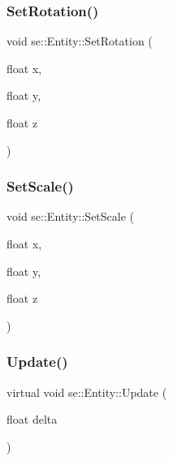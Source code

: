 \mbox{\label{classse_1_1_entity_a41f820b99b2b6d76c97472dcddca7fa2}} 
\subsubsection{\texorpdfstring{Set\+Rotation()}{SetRotation()}}
{\footnotesize\ttfamily void se\+::\+Entity\+::\+Set\+Rotation (\begin{DoxyParamCaption}\item[{float}]{x,  }\item[{float}]{y,  }\item[{float}]{z }\end{DoxyParamCaption})}

\mbox{\label{classse_1_1_entity_a812b63adcbf5f1a3e429a31c6e0ff940}} 
\subsubsection{\texorpdfstring{Set\+Scale()}{SetScale()}}
{\footnotesize\ttfamily void se\+::\+Entity\+::\+Set\+Scale (\begin{DoxyParamCaption}\item[{float}]{x,  }\item[{float}]{y,  }\item[{float}]{z }\end{DoxyParamCaption})}

\mbox{\label{classse_1_1_entity_a1cd277c4c5a517f5cde8b72d5c40a8f0}} 
\subsubsection{\texorpdfstring{Update()}{Update()}}
{\footnotesize\ttfamily virtual void se\+::\+Entity\+::\+Update (\begin{DoxyParamCaption}\item[{float}]{delta }\end{DoxyParamCaption})\hspace{0.3cm}{\ttfamily [virtual]}}



